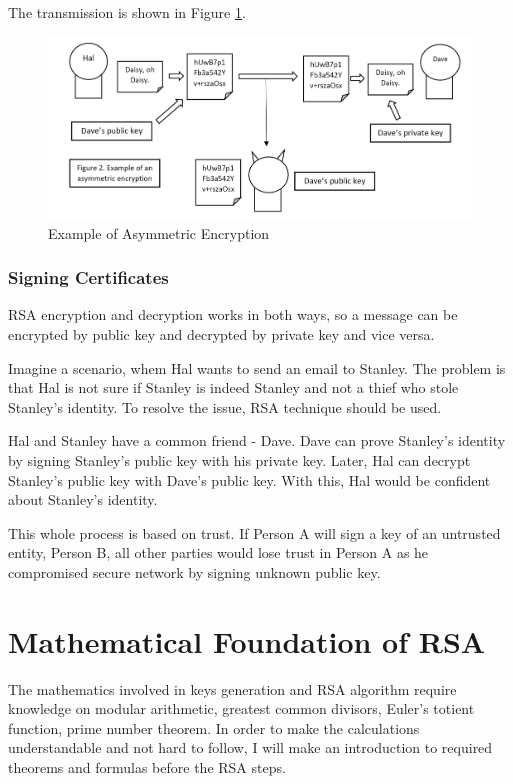 \documentclass[a4paper, 12pt]{article}
\begin{document}
The transmission is shown in Figure \ref{fig:asymmetric}.

\begin{figure}[h!]
  \begin{center}
    \includegraphics[width=\textwidth]{asymmetric.png}
    \caption{Example of Asymmetric Encryption}
    \label{fig:asymmetric}
    \end{center}
  \end{figure}

\subsubsection{Signing Certificates}
\label{bbsec:signing}

RSA encryption and decryption works in both ways, so a
message can be encrypted by public key and decrypted by private key and vice versa.

Imagine a scenario, whem Hal wants to send an email to Stanley. The problem is that Hal is not sure
if Stanley is indeed Stanley and not a thief who stole Stanley's identity. To resolve the issue, RSA
technique should be used. 

Hal and Stanley have a common friend - Dave. Dave can prove Stanley's identity by signing Stanley's
public key with his private key. Later, Hal can decrypt Stanley's public key with Dave's public key.
With this, Hal would be confident about Stanley's identity.

This whole process is based on trust. If Person A will sign a key of an untrusted entity, Person B, all other parties
would lose trust in Person A as he compromised secure network by signing unknown public key.

\section{Mathematical Foundation of RSA}
\label{sec:math}

The mathematics involved in keys generation and RSA algorithm require knowledge on modular
arithmetic, greatest common divisors, Euler's totient function, prime number theorem. In order to
make the calculations understandable and not hard to follow, I will make an introduction to
required theorems and formulas before the RSA steps.
\end{document}
